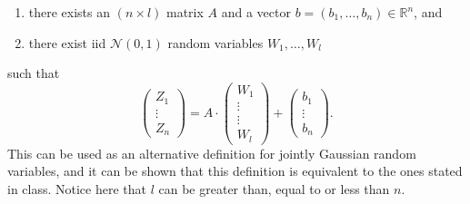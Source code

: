 \documentclass[11pt]{article}
\begin{document}
\begin{enumerate}
{\begin{enumerate}
		\item there exists an $(n\times l)$ matrix $A$ and a vector $b=(b_{1},\ldots,b_{n})\in \mathbb{R}^{n}$, and
		\item there exist iid $\mathcal{N}(0,1)$ random variables $W_{1},\ldots,W_{l}$
	\end{enumerate}
	such that
	\begin{equation*}
	\begin{pmatrix}
	Z_{1}\\
	\vdots\\
	Z_{n}
	\end{pmatrix}=A\cdot \begin{pmatrix}
	W_{1}\\
	\vdots\\
	\vdots\\
	W_{l}
	\end{pmatrix} + \begin{pmatrix}
	b_{1}\\
	\vdots\\
	b_{n}
	\end{pmatrix}.
	\end{equation*}
	This can be used as an alternative definition for jointly Gaussian random variables, and it can be shown that this definition is equivalent to the ones stated in class. Notice here that $l$ can be greater than, equal to or less than $n$.}
\end{enumerate}
\end{document}
